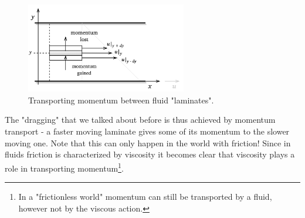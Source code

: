 \documentclass[10pt,twocolumn]{article}
\begin{document}
\begin{figure}[H]
\centering\includegraphics[width=7cm]{momentum-transport-in-laminates.png}
\caption{Transporting momentum between fluid "laminates".}
\label{fig:momentum-transport-in-laminates}
\end{figure}
The "dragging" that we talked about before is thus achieved by momentum transport - a faster moving laminate gives some of its momentum to the slower moving one. Note that this can only happen in the world with friction! Since in fluids friction is characterized by viscosity it becomes clear that viscosity plays a role in transporting momentum\footnote{In a "frictionless world" momentum can still be transported by a fluid, however not by the viscous action.}.
\end{document}

